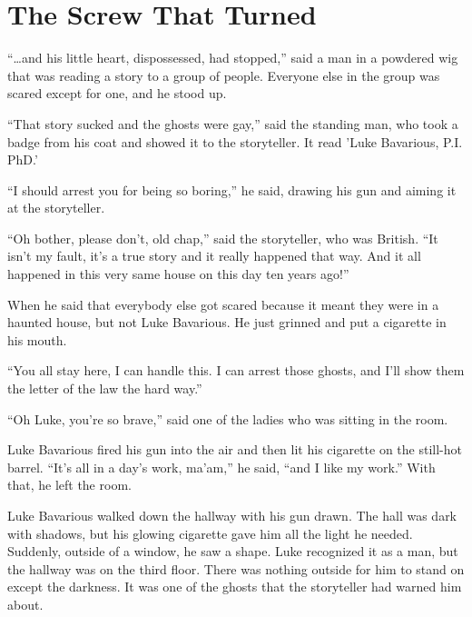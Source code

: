 \chapter{The Screw That Turned}

``{\ldots}and his little heart, dispossessed, had stopped,'' said a man in
a powdered wig that was reading a story to a group of people.
Everyone else in the group was scared except for one, and he stood
up.



``That story sucked and the ghosts were gay,'' said the standing man,
who took a badge from his coat and showed it to the storyteller. It
read 'Luke Bavarious, P.I. PhD.'



``I should arrest you for being so boring,'' he said, drawing his gun
and aiming it at the storyteller.



``Oh bother, please don't, old chap,'' said the storyteller, who was
British. ``It isn't my fault, it's a true story and it really
happened that way. And it all happened in this very same house on
this day ten years ago!''



When he said that everybody else got scared because it meant they
were in a haunted house, but not Luke Bavarious. He just grinned
and put a cigarette in his mouth.



``You all stay here, I can handle this. I can arrest those ghosts,
and I'll show them the letter of the law the hard way.''



``Oh Luke, you're so brave,'' said one of the ladies who was sitting
in the room.



Luke Bavarious fired his gun into the air and then lit his
cigarette on the still-hot barrel. ``It's all in a day's work,
ma'am,'' he said, ``and I like my work.'' With that, he left the
room.



Luke Bavarious walked down the hallway with his gun drawn. The hall
was dark with shadows, but his glowing cigarette gave him all the
light he needed. Suddenly, outside of a window, he saw a shape.
Luke recognized it as a man, but the hallway was on the third
floor. There was nothing outside for him to stand on except the
darkness. It was one of the ghosts that the storyteller had warned
him about.



